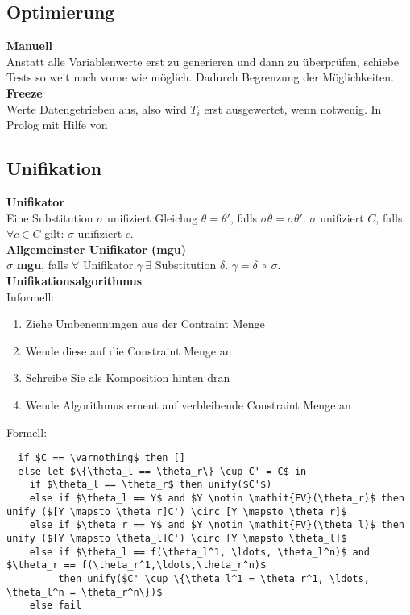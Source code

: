 \subsection{Optimierung}%
\label{lp:sub:optimierung}
\textbf{Manuell}\\
Anstatt alle Variablenwerte erst zu generieren und dann zu überprüfen, schiebe Tests so weit nach vorne wie möglich.
Dadurch Begrenzung der Möglichkeiten.\\

\textbf{Freeze}\\
Werte Datengetrieben aus, also wird \(T_i\) erst ausgewertet, wenn notwenig.
In Prolog mit Hilfe von 

\subsection{Unifikation}%
\label{lp:sub:unifikation}
\textbf{Unifikator}\\
Eine Substitution \(\sigma\) unifiziert Gleichug \(\theta = \theta'\), falls \(\sigma\theta = \sigma\theta'\).
\(\sigma\) unifiziert \(C\), falls \(\forall c \in C\) gilt: \(\sigma\) unifiziert \(c\).\\
\textbf{Allgemeinster Unifikator (mgu)}\\
\(\sigma\) \textbf{mgu}, falls \(\forall\) Unifikator \(\gamma\ \exists\) Substitution \(\delta\). \( \gamma = \delta\ \circ\ \sigma\).\\

\textbf{Unifikationsalgorithmus}\\
Informell:
\begin{enumerate}
  \item Ziehe Umbenennungen aus der Contraint Menge
  \item Wende diese auf die Constraint Menge an
  \item Schreibe Sie als Komposition hinten dran
  \item Wende Algorithmus erneut auf verbleibende Constraint Menge an
\end{enumerate}
Formell:
\begin{lstlisting}
  if $C == \varnothing$ then []
  else let $\{\theta_l == \theta_r\} \cup C' = C$ in
    if $\theta_l == \theta_r$ then unify($C'$)
    else if $\theta_l == Y$ and $Y \notin \mathit{FV}(\theta_r)$ then unify ($[Y \mapsto \theta_r]C') \circ [Y \mapsto \theta_r]$
    else if $\theta_r == Y$ and $Y \notin \mathit{FV}(\theta_l)$ then unify ($[Y \mapsto \theta_l]C') \circ [Y \mapsto \theta_l]$
    else if $\theta_l == f(\theta_l^1, \ldots, \theta_l^n)$ and $\theta_r == f(\theta_r^1,\ldots,\theta_r^n)$
         then unify($C' \cup \{\theta_l^1 = \theta_r^1, \ldots, \theta_l^n = \theta_r^n\})$
    else fail
\end{lstlisting}
  
